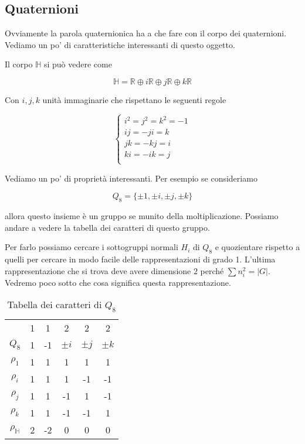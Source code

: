 \documentclass[11pt]{article}
\theoremstyle{plain}
\theoremstyle{definition}
\theoremstyle{remark}
\newcommand{\R}{\mathbb{R}}
\newcommand{\HH}{\mathbb{H}}
\begin{document}
\subsection{Quaternioni}

Ovviamente la parola quaternionica ha a che fare con il corpo dei quaternioni. Vediamo un po' di caratteristiche interessanti di questo oggetto.

Il corpo $\HH$ si può vedere come

\[\HH = \R \oplus i \R \oplus j \R \oplus k \R \]

Con $i,j,k$ unità immaginarie che rispettano le seguenti regole

\[ 
\begin{cases}
i^2 = j^2 = k^2 = -1 \\
ij = - ji = k \\
jk = -kj = i \\
ki = - ik = j \\
\end{cases}
\]


Vediamo un po' di proprietà interessanti. Per esempio se consideriamo 

\[ Q_8 =  \{\pm 1, \pm i, \pm j, \pm k \}\]

allora questo insieme è un gruppo se munito della moltiplicazione. Possiamo andare a vedere la tabella dei caratteri di questo gruppo. 


Per farlo possiamo cercare i sottogruppi normali $H_i$ di $Q_8$ e quozientare rispetto a quelli per cercare in modo facile delle rappresentazioni di grado 1. L'ultima rappresentazione che si trova deve avere dimensione $2$ perché $\sum n_i^2 = |G|$. Vedremo poco sotto che cosa significa questa rappresentazione.


\begin{table}[!ht]
\centering
\begin{tabular}{|c|c|c|c|c|c|}
\hline
& 1 & 1 & 2 & 2 & 2 \\
$Q_8$ & 1 & -1 & $\pm i$ & $\pm j$ & $\pm k$ \\
\hline
$\rho_1$ & 1 & 1 & 1 & 1 & 1 \\
\hline
$\rho_i$ & 1 & 1 & 1 & -1 & -1 \\
\hline
$\rho_j$ & 1 & 1 & -1 & 1 & -1 \\
\hline
$\rho_k$ & 1 & 1 & -1 & -1 & 1 \\
\hline
$\rho_\HH$ & 2 & -2 & 0 & 0 & 0 \\
\hline
\end{tabular}
\caption{Tabella dei caratteri di $Q_8$}
\label{tab: caratteri q8}
\end{table}
\end{document}
